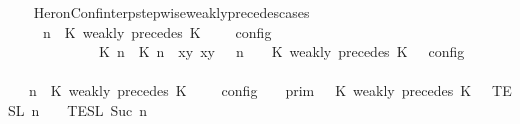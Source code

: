 \begin{isabellebody}
\isanewline
\ \ \isamarkupfalse%
%
\endisatagproof
{\isafoldproof}%
%
\isadelimproof
\isanewline
%
\endisadelimproof
\isanewline
{}\isamarkupfalse%
\ HeronConf{\isacharunderscore}interp{\isacharunderscore}stepwise{\isacharunderscore}weakly{\isacharunderscore}precedes{\isacharunderscore}cases{\isacharcolon}\isanewline
\ \ \ {\isacartoucheopen}{\isasymlbrakk}\ {\isasymGamma}{\isacharcomma}\ n\ {\isasymturnstile}\ {\isacharparenleft}{\isacharparenleft}K\ weakly\ precedes\ K\ {\isacharhash}\ {\isasymPsi}{\isacharparenright}\ {\isasymtriangleright}\ {\isasymPhi}\ {\isasymrbrakk}\isactrlsub c\isactrlsub o\isactrlsub n\isactrlsub f\isactrlsub i\isactrlsub g\isanewline
\ \ \ \ \ \ \ \ \ \ {\isacharequal}\ {\isasymlbrakk}\ {\isacharparenleft}{\isacharparenleft}{\isasymlceil}{\isacharhash}\isactrlsup {\isasymle}\ K\ n{\isacharcomma}\ {\isacharhash}\isactrlsup {\isasymle}\ K\ n{\isasymrceil}\ {\isasymin}\ {\isacharparenleft}{\isasymlambda}{\isacharparenleft}x{\isacharcomma}y{\isacharparenright}{\isachardot}\ x{\isasymle}y{\isacharparenright}{\isacharparenright}\ {\isacharhash}\ {\isasymGamma}{\isacharparenright}{\isacharcomma}\ n\ {\isasymturnstile}\ {\isasymPsi}\ {\isasymtriangleright}\ {\isacharparenleft}{\isacharparenleft}K\ weakly\ precedes\ K\ {\isacharhash}\ {\isasymPhi}{\isacharparenright}\ {\isasymrbrakk}\isactrlsub c\isactrlsub o\isactrlsub n\isactrlsub f\isactrlsub i\isactrlsub g{\isacartoucheclose}\isanewline
%
\isadelimproof
\ \ %
\endisadelimproof
%
\isatagproof
{}\isamarkupfalse%
\ {\isacharminus}\isanewline
\ \ \ \ \isamarkupfalse%
\ {\isacartoucheopen}{\isasymlbrakk}\ {\isasymGamma}{\isacharcomma}\ n\ {\isasymturnstile}\ {\isacharparenleft}K\ weakly\ precedes\ K\ {\isacharhash}\ {\isasymPsi}\ {\isasymtriangleright}\ {\isasymPhi}\ {\isasymrbrakk}\isactrlsub c\isactrlsub o\isactrlsub n\isactrlsub f\isactrlsub i\isactrlsub g\ {\isacharequal}\ {\isasymlbrakk}{\isasymlbrakk}\ {\isasymGamma}\ {\isasymrbrakk}{\isasymrbrakk}\isactrlsub p\isactrlsub r\isactrlsub i\isactrlsub m\ {\isasyminter}\ {\isasymlbrakk}{\isasymlbrakk}\ {\isacharparenleft}K\ weakly\ precedes\ K\ {\isacharhash}\ {\isasymPsi}\ {\isasymrbrakk}{\isasymrbrakk}\isactrlsub T\isactrlsub E\isactrlsub S\isactrlsub L\isactrlbsup {\isasymge}\ n\isactrlesup \ {\isasyminter}\ {\isasymlbrakk}{\isasymlbrakk}\ {\isasymPhi}\ {\isasymrbrakk}{\isasymrbrakk}\isactrlsub T\isactrlsub E\isactrlsub S\isactrlsub L\isactrlbsup {\isasymge}\ Suc\ n\isactrlesup {\isacartoucheclose}\isanewline

\end{isabellebody}
